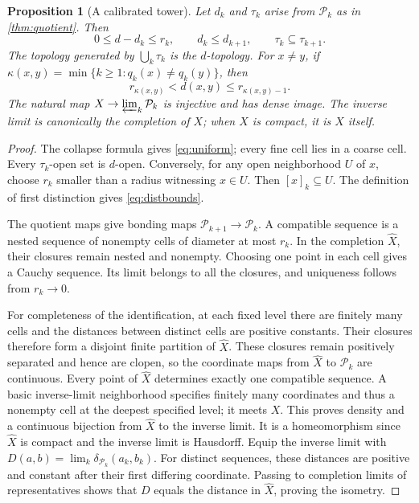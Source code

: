 \documentclass[11pt]{article}
\newtheorem{proposition}[theorem]{Proposition}
\theoremstyle{definition}
\theoremstyle{remark}
\newcommand{\PP}{\mathcal P}
\begin{document}
\begin{proposition}[A calibrated tower]\label{prop:tower}
Let $d_k$ and $\tau_k$ arise from $\PP_k$ as in \cref{thm:quotient}. Then
\begin{equation}\label{eq:uniform}
 0\leq d-d_k\leq r_k,\qquad d_k\leq d_{k+1},
 \qquad \tau_k\subseteq\tau_{k+1}.
\end{equation}
The topology generated by $\bigcup_k\tau_k$ is the $d$-topology. For $x\ne y$, if
$\kappa(x,y)=\min\{k\geq1:q_k(x)\ne q_k(y)\}$, then
\begin{equation}\label{eq:distbounds}
 r_{\kappa(x,y)}<d(x,y)\leq r_{\kappa(x,y)-1}.
\end{equation}
The natural map $X\to\varprojlim_k\PP_k$ is injective and has dense image. The inverse limit is canonically the completion of $X$; when $X$ is compact, it is $X$ itself.
\end{proposition}
\begin{proof}
The collapse formula gives \eqref{eq:uniform}; every fine cell lies in a coarse cell. Every $\tau_k$-open set is $d$-open. Conversely, for any open neighborhood $U$ of $x$, choose $r_k$ smaller than a radius witnessing $x\in U$. Then $[x]_k\subseteq U$. The definition of first distinction gives \eqref{eq:distbounds}.

The quotient maps give bonding maps $\PP_{k+1}\to\PP_k$. A compatible sequence is a nested sequence of nonempty cells of diameter at most $r_k$. In the completion $\widehat X$, their closures remain nested and nonempty. Choosing one point in each cell gives a Cauchy sequence. Its limit belongs to all the closures, and uniqueness follows from $r_k\to0$.

For completeness of the identification, at each fixed level there are finitely many cells and the distances between distinct cells are positive constants. Their closures therefore form a disjoint finite partition of $\widehat X$. These closures remain positively separated and hence are clopen, so the coordinate maps from $\widehat X$ to $\PP_k$ are continuous. Every point of $\widehat X$ determines exactly one compatible sequence. A basic inverse-limit neighborhood specifies finitely many coordinates and thus a nonempty cell at the deepest specified level; it meets $X$. This proves density and a continuous bijection from $\widehat X$ to the inverse limit. It is a homeomorphism since $\widehat X$ is compact and the inverse limit is Hausdorff. Equip the inverse limit with
$D(a,b)=\lim_k\delta_{\PP_k}(a_k,b_k)$. For distinct sequences, these distances are positive and constant after their first differing coordinate. Passing to completion limits of representatives shows that $D$ equals the distance in $\widehat X$, proving the isometry.
\end{proof}
\end{document}
